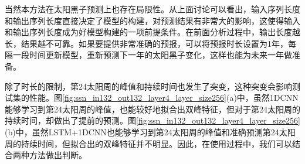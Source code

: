 当然本方法在太阳黑子预测上也存在局限性。从上面讨论可以看出，输入序列长度和输出序列长度直接决定了模型的构建，对预测结果有非常大的影响，这使得输入和输出序列长度成为好模型构建的一项前提条件。在前面分析过程中，输出长度越长，结果越不可靠。如果要提供非常准确的预报，可以将预报时长设置为1年，每隔一段时间更新模型，重新预测下一年的太阳黑子变化，这样也能为未来一年做准备。

除了时长的限制，第24太阳周的峰值和持续时间也发生了突变，这种突变会影响测试集的性能。图\ref{fig:ssn_in132_out132_layer4_layer_size256}(a)中，虽然1DCNN能够学习到第24太阳周的峰值，也能较好地拟合出双峰特征，但对于第24太阳周的持续时间，却做出了提前的预测。图\ref{fig:ssn_in132_out132_layer4_layer_size256}(b)中，虽然LSTM+1DCNN也能够学习到第24太阳周的峰值和准确预测第24太阳周的持续时间，但拟合出的双峰特征并不明显。因此，在使用过程中，我们可以结合两种方法做出判断。

